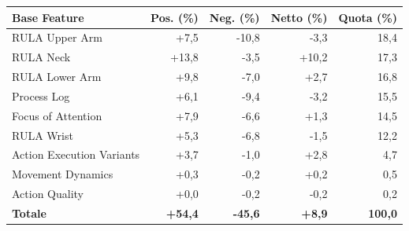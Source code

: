 \begin{tabular*}{\linewidth}{@{}l@{\extracolsep{\fill}}rrrr@{}}
\toprule
\textbf{Base Feature} & \textbf{Pos. (\%)} & \textbf{Neg. (\%)} & \textbf{Netto (\%)} & \textbf{Quota (\%)} \\
\midrule
RULA Upper Arm & +7{,}5 & -10{,}8 & -3{,}3 & 18{,}4 \\
RULA Neck & +13{,}8 & -3{,}5 & +10{,}2 & 17{,}3 \\
RULA Lower Arm & +9{,}8 & -7{,}0 & +2{,}7 & 16{,}8 \\
Process Log & +6{,}1 & -9{,}4 & -3{,}2 & 15{,}5 \\
Focus of Attention & +7{,}9 & -6{,}6 & +1{,}3 & 14{,}5 \\
RULA Wrist & +5{,}3 & -6{,}8 & -1{,}5 & 12{,}2 \\
Action Execution Variants & +3{,}7 & -1{,}0 & +2{,}8 & 4{,}7 \\
Movement Dynamics & +0{,}3 & -0{,}2 & +0{,}2 & 0{,}5 \\
Action Quality & +0{,}0 & -0{,}2 & -0{,}2 & 0{,}2 \\
\midrule
\textbf{Totale} & \textbf{+54{,}4} & \textbf{-45{,}6} & \textbf{+8{,}9} & \textbf{100{,}0} \\
\bottomrule
\end{tabular*}
